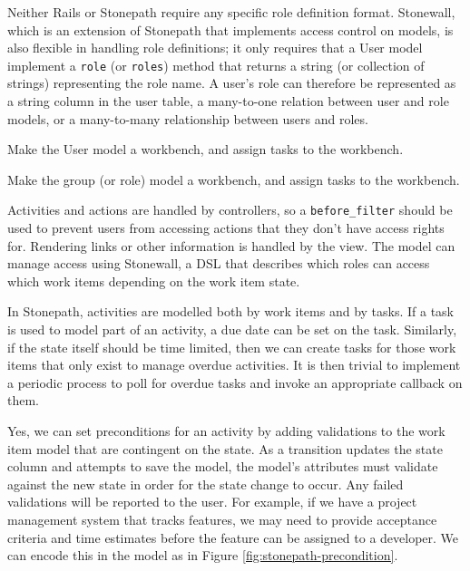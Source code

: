 
Neither Rails or Stonepath require any specific role definition format. Stonewall, which is an extension of Stonepath that implements access control on models, is also flexible in handling role definitions; it only requires that a User model implement a \verb!role! (or \verb!roles!) method that returns a string (or collection of strings) representing the role name. A user’s role can therefore be represented as a string column in the user table, a many-to-one relation between user and role models, or a many-to-many relationship between users and roles.


Make the User model a workbench, and assign tasks to the workbench.


Make the group (or role) model a workbench, and assign tasks to the workbench.


Activities and actions are handled by controllers, so a \verb!before_filter! should be used to prevent users from accessing actions that they don’t have access rights for. Rendering links or other information is handled by the view. The model can manage access using Stonewall, a DSL that describes which roles can access which work items depending on the work item state.


In Stonepath, activities are modelled both by work items and by tasks. If a task is used to model part of an activity, a due date can be set on the task. Similarly, if the state itself should be time limited, then we can create tasks for those work items that only exist to manage overdue activities. It is then trivial to implement a periodic process to poll for overdue tasks and invoke an appropriate callback on them.


Yes, we can set preconditions for an activity by adding validations to the work item model that are contingent on the state. As a transition updates the state column and attempts to save the model, the model’s attributes must validate against the new state in order for the state change to occur. Any failed validations will be reported to the user. For example, if we have a project management system that tracks features, we may need to provide acceptance criteria and time estimates before the feature can be assigned to a developer.
We can encode this in the model as in Figure \ref{fig:stonepath-precondition}.

